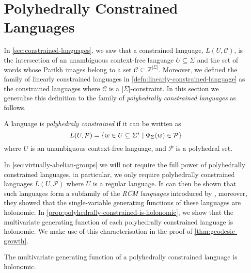 \section{Polyhedrally Constrained Languages}\label{sec:polyhedrally-constrained-languages}

In \cref{sec:constrained-languages}, we saw that a constrained language, $L(U,\mathcal{C})$, is the intersection of an unambiguous context-free language $U \subseteq \Sigma$ and the set of words whose Parikh images belong to a set $\mathcal{C} \subseteq \mathbb{Z}^{|\Sigma|}$.
Moreover, we defined the family of linearly constrained languages in \cref{defn:linearly-constrained-language} as the constrained languages where $\mathcal{C}$ is a $|\Sigma|$-constraint.
In this section we generalise this definition to the family of \emph{polyhedrally constrained languages} as follows.

\begin{definition}\label{defn:polyhedrally-constrained-language}
	A language is \emph{polyhedraly constrained} if it can be written as
	\[
		L(U,\mathcal{P})
		=
		\left\{
			w \in U \subseteq \Sigma^*
		\mid
			\Phi_\Sigma(w) \in \mathcal{P}
		\right\}
	\]
	where $U$ is an unambiguous context-free language, and $\mathcal{P}$ is a polyhedral set.
\end{definition}

In \cref{sec:virtually-abelian-groups} we will not require the full power of polyhedrally constrained languages, in particular, we only require polyhedrally constrained languages $L(U,\mathcal{P})$ where $U$ is a regular language.
It can then be shown that such languages form a subfamily of the \emph{RCM languages} introduced by \textcite{castiglione2017}, moreover, they showed that the single-variable generating functions of these languages are holonomic.
In \cref{prop:polyhedrally-constrained-is-holonomic}, we show that the multivariate generating function of each polyhedrally constrained language is holonomic.
We make use of this characterisation in the proof of \cref{thm:geodesic-growth}.

\begin{proposition}\label{prop:polyhedrally-constrained-is-holonomic}
	The multivariate generating function of a polyhedrally constrained language is holonomic.
\end{proposition}

